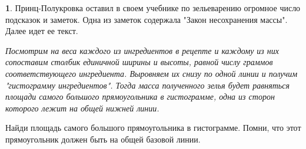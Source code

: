 \documentclass[14pt, a4paper]{extarticle}
\theoremstyle{definition}
\newtheorem{problem}{}
\theoremstyle{definition}
\theoremstyle{remark}
\numberwithin{equation}{section}
\begin{document}
\begin{problem}
    Принц-Полукровка оставил в своем учебнике по зельеварению 
    огромное число подсказок и заметок. Одна из заметок содержала 
    "Закон несохранения массы". Далее идет ее текст.

    \textit{Посмотрим на веса каждого из ингредиентов в рецепте и 
    каждому из них сопоставим столбик единичной ширины и высоты, 
    равной числу граммов соответствующего ингредиента. 
    Выровняем их снизу по одной линии и получим "гистограмму 
    ингредиентов". Тогда масса полученного зелья будет равняться 
    площади самого большого прямоугольника в гистограмме, одна 
    из сторон которого лежит на общей нижней линии.}

    Найди площадь самого большого прямоугольника в гистограмме. 
    Помни, что этот прямоугольник должен быть на общей базовой линии.

    \begin{figure}[H]
        \centering


    \end{figure}
\end{problem}
\end{document}
